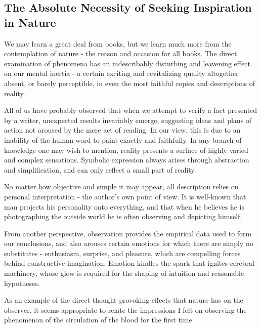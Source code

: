\documentclass{article}
\begin{document}
\subsection*{The Absolute Necessity of Seeking Inspiration in Nature}

We may learn a great deal from books, but we learn much more from the contemplation of nature - the reason and occasion for all books. The direct examination of phenomena has an indescribably disturbing and leavening effect on our mental inertia - a certain exciting and revitalizing quality altogether absent, or barely perceptible, in even the most faithful copies and descriptions of reality.

All of us have probably observed that when we attempt to verify a fact presented by a writer, unexpected results invariably emerge, suggesting ideas and plans of action not aroused by the mere act of reading. In our view, this is due to an inability of the human word to paint exactly and faithfully. In any branch of knowledge one may wish to mention, reality presents a surface of highly varied and complex sensations. Symbolic expression always arises through abstraction and simplification, and can only reflect a small part of reality.

No matter how objective and simple it may appear, all description relies on personal interpretation - the author’s own point of view. It is well-known that man projects his personality onto everything, and that when he believes he is photographing the outside world he is often observing and depicting himself.

From another perspective, observation provides the empirical data used to form our conclusions, and also arouses certain emotions for which there are simply no substitutes - enthusiasm, surprise, and pleasure, which are compelling forces behind constructive imagination. Emotion kindles the spark that ignites cerebral machinery, whose glow is required for the shaping of intuition and reasonable hypotheses.

As an example of the direct thought-provoking effects that nature has on the observer, it seems appropriate to relate the impressions I felt on observing the phenomenon of the circulation of the blood for the first time.
\end{document}
